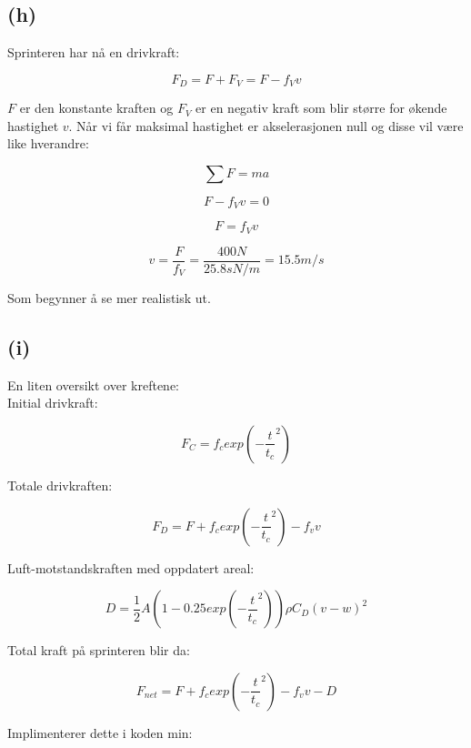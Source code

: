 \documentclass[a4paper,norsk,12pt]{article}
\begin{document}
\noindent
\subsection*{(h)}

\noindent
Sprinteren har nå en drivkraft:

$$ F_D = F + F_V = F - f_V v $$

\noindent
$F$ er den konstante kraften og $F_V$ er en negativ kraft som blir større for økende hastighet $v$. Når vi får maksimal hastighet er akselerasjonen null og disse vil være like hverandre:

$$ \sum F = ma $$ 

$$ F - f_V v = 0 $$

$$ F = f_V v $$ 

$$ v = \dfrac{F}{f_V} = \dfrac{400 N}{25.8 sN/m} = 15.5 m/s $$

\noindent
Som begynner å se mer realistisk ut.\\

\noindent
\subsection*{(i)}

En liten oversikt over kreftene:\\

Initial drivkraft:

\begin{equation}
	F_C = f_c exp(-\dfrac{t}{t_c}^2)
\end{equation}


Totale drivkraften:

\begin{equation}
	F_D = F + f_c exp(-\dfrac{t}{t_c}^2) - f_v v
\end{equation}

Luft-motstandskraften med oppdatert areal:

\begin{equation}
	D =\dfrac{1}{2} A (1-0.25 exp(-\dfrac{t}{t_c}^2)) \rho C_D (v-w)^2
\end{equation}

Total kraft på sprinteren blir da:

\begin{equation}
	F_{net} = F + f_c exp(-\dfrac{t}{t_c}^2) - f_v v - D
\end{equation}

\noindent
Implimenterer dette i koden min:


\end{document}

